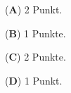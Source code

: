 \begin{bewertung}
\begin{teilaufgaben}
\item
({\bf A}) 2 Punkt.
\item
({\bf B}) 1 Punkte.
\item
({\bf C}) 2 Punkte.
\item
({\bf D}) 1 Punkt.
\end{teilaufgaben}
\end{bewertung}

